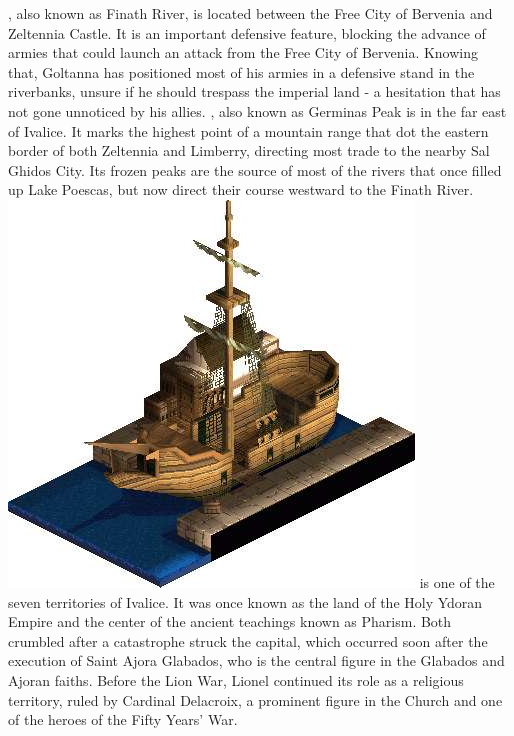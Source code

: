 \ofpar
%
, also known as Finath River, is located between the Free City of Bervenia and Zeltennia Castle. 
It is an important defensive feature, blocking the advance of armies that could launch an attack from the Free City of Bervenia.
Knowing that, Goltanna has positioned most of his armies in a defensive stand in the riverbanks, unsure if he should trespass the imperial land - a hesitation that has not gone unnoticed by his allies.
, also known as Germinas Peak is in the far east of Ivalice. It marks the highest point of a mountain range that dot
the eastern border of both Zeltennia and Limberry, directing most trade to the nearby Sal Ghidos City. 
Its frozen peaks are the source of most of the rivers that once filled up Lake Poescas, but now direct their course westward to the Finath River.
%
\ofpar
\includegraphics[width=\columnwidth]{./art/worldbook/warjilis.jpg}
\ofpar
%
 is one of the seven territories of Ivalice. 
It was once known as the land of the Holy Ydoran Empire and the center of the ancient teachings known as Pharism.
Both crumbled after a catastrophe struck the capital, which occurred soon after the execution of Saint Ajora Glabados, who is the central figure in the Glabados and Ajoran faiths. 
Before the Lion War, Lionel continued its role as a religious territory, ruled by Cardinal Delacroix, a prominent figure in the Church and one of the heroes of the Fifty Years' War. 
